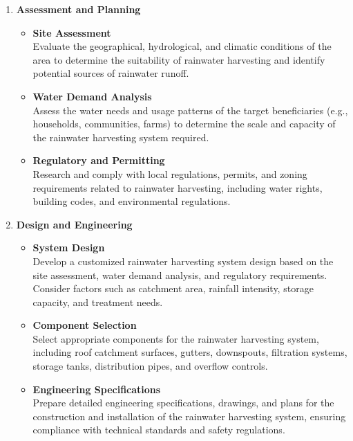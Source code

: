 \documentclass[12pt]{article}
\begin{document}
	\begin{enumerate}[label=\textbf{\arabic*.}]
		\item \textbf{Assessment and Planning}
		\begin{itemize}
			\item \textbf{Site Assessment} \\
			Evaluate the geographical, hydrological, and climatic conditions of the area to determine the suitability of rainwater harvesting and identify potential sources of rainwater runoff.
			\item \textbf{Water Demand Analysis} \\
			Assess the water needs and usage patterns of the target beneficiaries (e.g., households, communities, farms) to determine the scale and capacity of the rainwater harvesting system required.
			\item \textbf{Regulatory and Permitting} \\
			Research and comply with local regulations, permits, and zoning requirements related to rainwater harvesting, including water rights, building codes, and environmental regulations.
		\end{itemize}

		\item \textbf{Design and Engineering}
		\begin{itemize}
			\item \textbf{System Design} \\
			Develop a customized rainwater harvesting system design based on the site assessment, water demand analysis, and regulatory requirements. Consider factors such as catchment area, rainfall intensity, storage capacity, and treatment needs.
			\item \textbf{Component Selection} \\
			Select appropriate components for the rainwater harvesting system, including roof catchment surfaces, gutters, downspouts, filtration systems, storage tanks, distribution pipes, and overflow controls.
			 \newpage
			\item \textbf{Engineering Specifications} \\
			Prepare detailed engineering specifications, drawings, and plans for the construction and installation of the rainwater harvesting system, ensuring compliance with technical standards and safety regulations.
		\end{itemize}


\end{enumerate}
\end{document}
